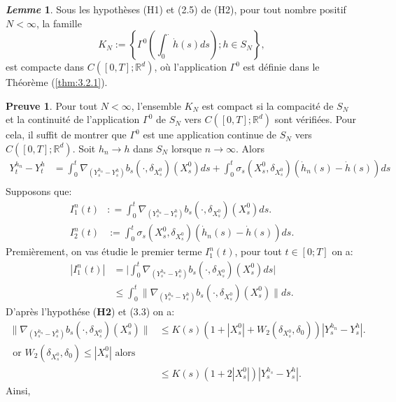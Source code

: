 \documentclass[12pt,a4paper,twoside]{report}%
\theoremstyle{definition}
\newtheorem*{pr}{\textbf{Preuve}}
\newtheorem{lem}[dfn]{\textit{Lemme}}
\numberwithin{equation}{section}
\begin{document}
	 \begin{lem}\label{lem:3.2.5}
	 	 Sous les hypothèses (H1) et (2.5) de (H2), pour tout nombre positif
	 	$N<\infty$, la famille
	 	\[K_N := \left\{ \Gamma^0 \left( \int_0^{\cdot} \dot{h}(s) ds \right); h \in S_N \right\},\]
	 	est compacte dans \(C([0,T]; \mathbb{R}^d)\), où l'application \(\Gamma^0\) est définie dans le Théorème (\ref{thm:3.2.1}).
	 \end{lem}
	 \begin{pr}
	 	 Pour tout \( N < \infty \), l'ensemble \( K_N \) est compact si la compacité de \( S_N \) et la continuité de l'application \(\Gamma^0\) de \( S_N \) vers \( C([0, T]; \mathbb{R}^d) \) sont vérifiées. Pour cela, il suffit de montrer que \(\Gamma^0\) est une application continue de \( S_N \) vers \( C([0, T]; \mathbb{R}^d) \). Soit \( h_n \to h \) dans \( S_N \) lorsque \( n \to \infty \). Alors
	 	\[
	 	\begin{aligned}
	 		Y_t^{h_n} - Y_t^h &= \int_0^t \nabla_{(Y_s^{h_n} - Y_s^h)} b_s (\cdot, \delta_{X_s^0}) (X_s^0) ds + \int_0^t \sigma_s (X_s^0, \delta_{X_s^0}) (\dot{h}_n(s) - \dot{h}(s)) ds\\
	 	\end{aligned}
	 	\]
	 	Supposons que:
	 	\[
	 	\begin{aligned}
	 I_1^n(t) &: =	 \int_0^t \nabla_{(Y_s^{h_n} - Y_s^h)} b_s (\cdot, \delta_{X_s^0}) (X_s^0) ds.\\
	 I_2^n(t) &:=  \int_0^t \sigma_s (X_s^0, \delta_{X_s^0}) (\dot{h}_n(s) - \dot{h}(s)) ds.
	 	 	\end{aligned}
	 	\]
	 	Premièrement, on vas étudie le premier terme $I_1^n(t)$, pour tout $t\in [0;T]$ on a:
	 	\[
	 	\begin{aligned}
	 	|I_1^n(t)| &= \Big|\int_{0}^{t}\nabla_{(Y_s^{h_n} - Y_s^h)}b_s(\cdot,\delta_{X_s^0})(X_s^0)ds\Big|\\
	 	&\leq \int_{0}^{t}\Big\|\nabla_{(Y_s^{h_n} - Y_s^h)}b_s(\cdot,\delta_{X_s^0})(X_s^0)\Big\|ds.
	 	\end{aligned}
	 	\]
	 	D'après l'hypothése (\textbf{H2}) et (3.3) on a:
	 	\[\begin{aligned}
	 	\Big\|\nabla_{(Y_s^{h_n} - Y_s^h)}b_s(\cdot,\delta_{X_s^0})(X_s^0)\Big\|&\leq K(s)(1+|X_s^0| + W_2(\delta_{X_s^0},\delta_0))|Y_s^{h_n}-Y_s^h|.\\ \text{ or } W_2(\delta_{X_s^0},\delta_0)\leq |X_s^0| \text{ alors }\\
	 	&\leq K(s)(1 + 2|X_s^0|)|Y_s^{h_s}-Y_s^h|.
	 	\end{aligned}
	 	\]
	 	Ainsi,

\end{pr}
\end{document}
